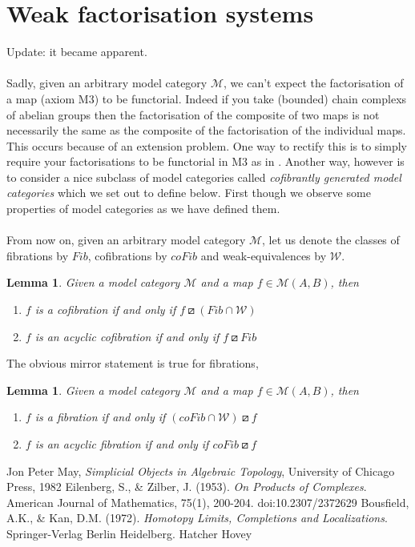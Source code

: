 \documentclass{amsart}
\newtheorem{lemma}[theorem]{Lemma}
\theoremstyle{definition}
\begin{document}
\section{Weak factorisation systems}
Update: it became apparent.
\\
\\ \indent
Sadly, given an arbitrary model category $\mathcal{M}$, we can't expect the
factorisation of a map (axiom M3) to be functorial. Indeed if you take
(bounded) chain complexs of abelian groups then the factorisation of the
composite of two maps is not necessarily the same as the
composite of the factorisation of the individual maps. This occurs because of
an extension problem. One way to rectify this is to
simply require your factorisations
to be functorial in M3 as in \cite{Hov}. Another way, however is to consider a
nice subclass of model categories called \textit{cofibrantly generated model
  categories} which we set out to define below. First though we observe some
properties of model categories as we have defined them.
\\
\\
\indent
From now on, given an arbitrary model category $\mathcal{M}$, let us denote
the classes of fibrations by $Fib$, cofibrations by $coFib$ and weak-equivalences
by $\mathcal{W}$.
\begin{lemma}
      Given a model category $\mathcal{M}$ and a map $f\in \mathcal{M}(A,B)$, then
    \begin{enumerate}
    \item 
      $f$ is a cofibration if and only if $f\boxslash (Fib\cap \mathcal{W})$
    \item 
      $f$ is an acyclic cofibration if and only if
      $f\boxslash Fib$
    \end{enumerate}
\end{lemma}
The obvious mirror statement is true for fibrations,

\begin{lemma}
      Given a model category $\mathcal{M}$ and a map $f\in \mathcal{M}(A,B)$, then
    \begin{enumerate}
    \item 
      $f$ is a fibration if and only if $(coFib\cap \mathcal{W})\boxslash f$
    \item 
      $f$ is an acyclic fibration if and only if
      $coFib \boxslash f$
    \end{enumerate}
\end{lemma}
\begin{thebibliography}{10}
 Jon Peter May, {\it Simplicial Objects in Algebraic Topology}, University of Chicago Press, 1982
 Eilenberg, S., \& Zilber, J. (1953). {\it On Products of Complexes}. American Journal of Mathematics, 75(1), 200-204. doi:10.2307/2372629
 Bousfield, A.K., \& Kan, D.M. (1972). {\it Homotopy Limits, Completions and Localizations}. Springer-Verlag Berlin Heidelberg.
 Hatcher
 Hovey
\end{thebibliography} 
\end{document}
